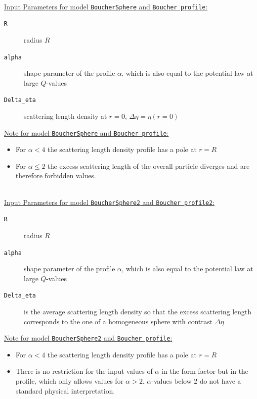 \vspace{5mm}

\hspace{1pt}\\
\underline{Input Parameters for model \texttt{BoucherSphere} and \texttt{Boucher profile}:}\\
\begin{description}
\item[\texttt{R}] radius $R$
\item[\texttt{alpha}] shape parameter of the profile $\alpha$, which is also equal to the potential law at large $Q$-values
\item[\texttt{Delta\_eta}] scattering length density at $r=0$, $\Delta\eta=\eta(r=0)$
\end{description}

\noindent\underline{Note for model \texttt{BoucherSphere} and \texttt{Boucher profile}:}
\begin{itemize}
\item For $\alpha<4$ the scattering length density profile has a pole at $r=R$
\item For $\alpha \leq 2$ the excess scattering length of the overall particle diverges and are therefore forbidden values.
\end{itemize}

\hspace{1pt}\\
\underline{Input Parameters for model \texttt{BoucherSphere2} and \texttt{Boucher profile2}:}\\
\begin{description}
\item[\texttt{R}] radius $R$
\item[\texttt{alpha}] shape parameter of the profile $\alpha$, which is also equal to the potential law at large $Q$-values
\item[\texttt{Delta\_eta}] is the average scattering length density so that the excess scattering length corresponds to the one of a homogeneous sphere with contrast $\Delta\eta$
\end{description}

\noindent\underline{Note for model \texttt{BoucherSphere2} and \texttt{Boucher profile}:}
\begin{itemize}
\item For $\alpha<4$ the scattering length density profile has a pole at $r=R$
\item There is no restriction for the input values of $\alpha$ in the form factor but in the profile, which only allows values for $\alpha>2$.  $\alpha$-values below 2 do not have a standard physical interpretation.
\end{itemize}

